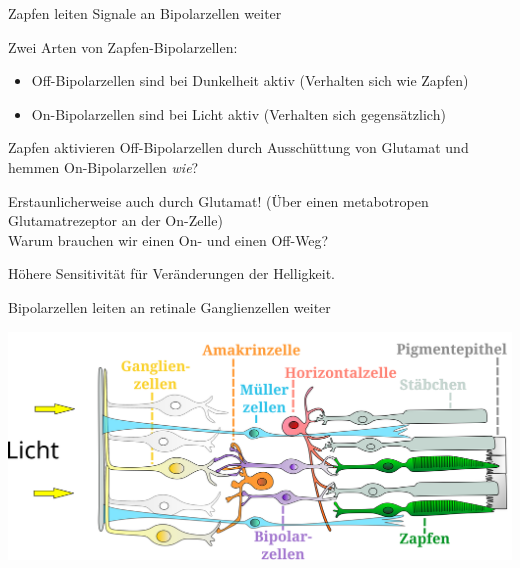 \documentclass{beamer}
\begin{document}






    



\begin{frame}{Zapfen leiten Signale an Bipolarzellen weiter}

Zwei Arten von Zapfen-Bipolarzellen: 

\begin{itemize}
    \item 
    Off-Bipolarzellen sind bei Dunkelheit aktiv (Verhalten sich wie Zapfen)
    \item
    On-Bipolarzellen sind bei Licht aktiv (Verhalten sich gegensätzlich)
\end{itemize}

\pause

Zapfen aktivieren Off-Bipolarzellen durch Ausschüttung von Glutamat und hemmen On-Bipolarzellen \emph{wie}?

\pause

Erstaunlicherweise auch durch Glutamat! (Über einen metabotropen Glutamatrezeptor an der On-Zelle) \\[0.5 cm]


\pause
Warum brauchen wir einen On- und einen Off-Weg?

Höhere Sensitivität für Veränderungen der Helligkeit.  \\


\end{frame}



    
    
\begin{frame}{Bipolarzellen leiten an retinale Ganglienzellen weiter}

\begin{center}
    \includegraphics[width=\textwidth]{Retina_de.png}
\end{center}

    
\end{frame}
\end{document}

